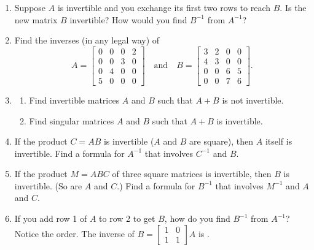 \documentclass[14pt, a4paper]{article}
\begin{document}
\begin{enumerate}
    \item Suppose $A$ is invertible and you exchange its first two rows to reach $B$. Is the new matrix $B$ invertible? How would you find $B^{-1}$ from $A^{-1}$?

    \item Find the inverses (in any legal way) of
          \[
              A = \begin{bmatrix}
                  0 & 0 & 0 & 2 \\
                  0 & 0 & 3 & 0 \\
                  0 & 4 & 0 & 0 \\
                  5 & 0 & 0 & 0
              \end{bmatrix}
              \quad\text{and}\quad
              B = \begin{bmatrix}
                  3 & 2 & 0 & 0 \\
                  4 & 3 & 0 & 0 \\
                  0 & 0 & 6 & 5 \\
                  0 & 0 & 7 & 6
              \end{bmatrix}.
          \]

    \item
          \begin{enumerate}
              \item Find invertible matrices $A$ and $B$ such that $A+B$ is not invertible.
              \item Find singular matrices $A$ and $B$ such that $A+B$ is invertible.
          \end{enumerate}

    \item If the product $C = AB$ is invertible ($A$ and $B$ are square), then $A$ itself is invertible. Find a formula for $A^{-1}$ that involves $C^{-1}$ and $B$.

    \item If the product $M = ABC$ of three square matrices is invertible, then $B$ is invertible. (So are $A$ and $C$.) Find a formula for $B^{-1}$ that involves $M^{-1}$ and $A$ and $C$.

    \item If you add row 1 of $A$ to row 2 to get $B$, how do you find $B^{-1}$ from $A^{-1}$?\\
          Notice the order. The inverse of $B = \begin{bmatrix} 1 & 0 \\ 1 & 1 \end{bmatrix} A$ is \underline{\hspace{4em}}.


\end{enumerate}
\end{document}
